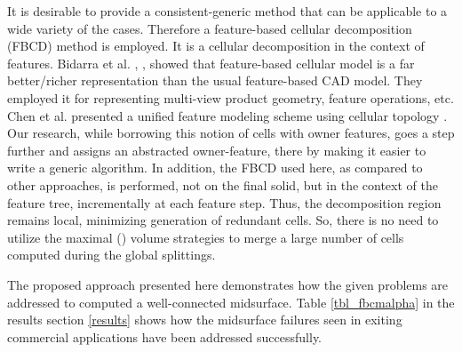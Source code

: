 It is desirable to provide a consistent-generic method that can be applicable to a wide variety of the cases. Therefore a feature-based cellular decomposition (FBCD) method is employed.  It is a cellular decomposition in the context of features. Bidarra et al. \cite{Bidarra1993}, \cite{Bidarra1997}, \cite{BidarraKrakerBronsvoort1998} showed that feature-based cellular model is a far better/richer representation than the usual feature-based CAD model. They employed it for representing multi-view product geometry, feature operations, etc. Chen et al. presented a unified feature modeling scheme using cellular topology \cite{Chen2006}. Our research, while borrowing this notion of cells with owner features, goes a step further and assigns an abstracted owner-feature, there by making it easier to write a generic algorithm.  In addition, the FBCD used here, as compared to other approaches, is performed, not on the final solid, but in the context of the feature tree, incrementally at each feature step. Thus, the decomposition region remains local, minimizing generation of redundant cells. So, there is no need to utilize the maximal (\cite{Woo2002}) volume strategies to merge a large number of cells computed during the global splittings. 

The proposed approach presented here demonstrates how the given problems are addressed to computed a well-connected midsurface. Table \ref{tbl_fbcmalpha} in the results section \ref{results} shows how the midsurface failures seen in exiting commercial applications have been addressed successfully.

